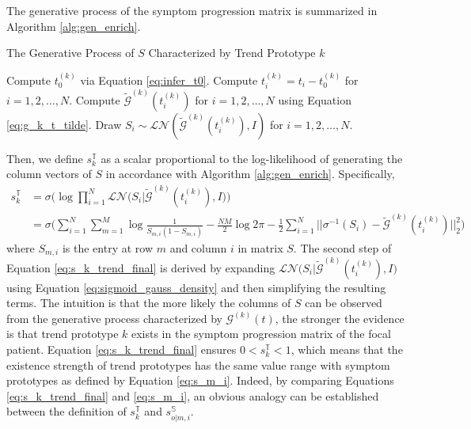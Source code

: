 \documentclass[mnsc]{informs3b} %
\begin{document}
The generative process of the symptom progression matrix is summarized in Algorithm \ref{alg:gen_enrich}.
\begin{algorithm}[h]
\caption{The Generative Process of $S$ Characterized by Trend Prototype $k$}\label{alg:gen_enrich}
\begin{algorithmic}[1]
\State Compute $t_0^{(k)}$ via Equation \ref{eq:infer_t0}.
\State Compute $t_i^{(k)} = t_i - t_0^{(k)}$ for $i=1,2,\dots,N$.
\State Compute ${\tilde{\mathcal{G}}}^{(k)}(t_i^{(k)})$ for $i=1,2,\dots,N$ using Equation \ref{eq:g_k_t_tilde}.
\State Draw $S_{i} \sim \mathcal{L} \mathcal{N}({\tilde{\mathcal{G}}}^{(k)}(t_i^{(k)}), I)$ for $i=1,2,\dots,N$.
\end{algorithmic}
\end{algorithm}
Then, we define $s_k^{\mathbb{T}}$ as a scalar proportional to the log-likelihood of generating the column vectors of $S$ in accordance with Algorithm \ref{alg:gen_enrich}. Specifically,
\begin{equation}
\label{eq:s_k_trend_final}
\begin{aligned}
s_k^{\mathbb{T}} &= \sigma \Big( \log \prod_{i=1}^{N} \mathcal{L}\mathcal{N} \big( S_{i}| \tilde{\mathcal{G}}^{(k)}(t_i^{(k)}), I \big) \Big) \\
&= \sigma \Big( \sum_{i=1}^{N} \sum_{m=1}^{M} \log \frac{1}{S_{m,i}(1-S_{m,i})} - \frac{NM}{2} \log 2\pi  - \frac{1}{2} \sum_{i=1}^{N} || \sigma^{-1}(S_{i})-\tilde{\mathcal{G}}^{(k)}(t_i^{(k)}) ||_2^2   \Big)
\end{aligned}
\end{equation}
where $S_{m,i}$ is the entry at row $m$ and column $i$ in matrix $S$. The second step of Equation \ref{eq:s_k_trend_final} is derived by expanding $\mathcal{L}\mathcal{N} \big( S_{i}| \tilde{\mathcal{G}}^{(k)}(t_i^{(k)}), I \big)$ using Equation \ref{eq:sigmoid_gauss_density} and then simplifying the resulting terms. The intuition is that the more likely the columns of $S$ can be observed from the generative process characterized by $\mathcal{G}^{(k)}(t)$, the stronger the evidence is that trend prototype $k$ exists in the symptom progression matrix of the focal patient. 
Equation \ref{eq:s_k_trend_final} ensures $0< s_k^{\mathbb{T}} < 1$, which means that the existence strength of trend prototypes has the same value range with symptom prototypes as defined by Equation \ref{eq:s_m_i}. Indeed, by comparing Equations \ref{eq:s_k_trend_final} and \ref{eq:s_m_i}, an obvious analogy can be established between the definition of $s_k^{\mathbb{T}}$ and $s_{o|m,i}^{\mathbb{S}}$.
\end{document}
